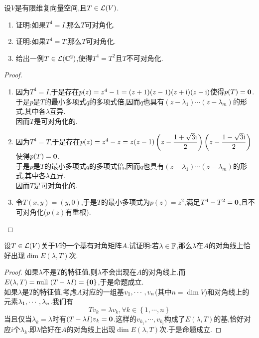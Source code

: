 \documentclass{ctexart}
\begin{document}
\pagestyle{empty}
\begin{center}
    \large{}
\end{center}
\begin{problem}[1.]
    设$V$是有限维复向量空间,且$T\in\mathcal{L}(V)$.
    \begin{enumerate}[label=\tbf{(\arabic*)}]
        \item 证明:如果$T^4=I$,那么$T$可对角化.
        \item 证明:如果$T^4=T$,那么$T$可对角化.
        \item 给出一例$T\in\mathcal{L}(\mathbb{C}^2)$,使得$T^4=T^2$且$T$不可对角化.
    \end{enumerate}
\end{problem}
\begin{proof}
    \begin{enumerate}[label=\tbf{(\arabic*)}]
        \item 因为$T^4=I$,于是存在$p(z)=z^4-1=(z+1)(z-1)(z+\text{i})(z-\text{i})$使得$p(T)=\mathbf0$.\\
            于是$p$是$T$的最小多项式$q$的多项式倍,因而$q$也具有$(z-\lambda_1)\cdots(z-\lambda_m)$的形式,其中各$\lambda$互异.\\
            因而$T$是可对角化的.
        \item 因为$T^4=T$,于是存在$p(z)=z^4-z=z(z-1)\left(z-\dfrac{1+\sqrt{3}\text{i}}{2}\right)\left(z-\dfrac{1-\sqrt3\text{i}}{2}\right)$使得$p(T)=\mathbf0$.\\
            于是$p$是$T$的最小多项式$q$的多项式倍,因而$q$也具有$(z-\lambda_1)\cdots(z-\lambda_m)$的形式,其中各$\lambda$互异.\\
            因而$T$是可对角化的.
        \item 令$T(x,y)=(y,0)$,于是$T$的最小多项式为$p(z)=z^2$,满足$T^4-T^2=\mathbf0$,且不可对角化($p(z)$有重根).
    \end{enumerate}
\end{proof}
\begin{problem}[2.]
    设$T\in\mathcal{L}(V)$关于$V$的一个基有对角矩阵$A$.试证明:若$\lambda\in\mathbb{F}$,那么$\lambda$在$A$的对角线上恰好出现$\dim E(\lambda,T)$次.
\end{problem}
\begin{proof}
    如果$\lambda$不是$T$的特征值,则$\lambda$不会出现在$A$的对角线上.而$E(\lambda,T)=\text{null }(T-\lambda I)=\left\{\mathbf0\right\}$,于是命题成立.\\
    如果$\lambda$是$T$的特征值,考虑$A$对应的一组基${v}_1,\cdots,{v}_{n}$(其中$n=\dim V$)和对角线上的元素${\lambda}_1,\cdots,{\lambda}_{n}$.我们有
    \[Tv_k=\lambda v_k,\forall k\in\left\{1,\cdots,n\right\}\]
    当且仅当$\lambda_k=\lambda$时有$(T-\lambda I)v_k=\mathbf0$.这样的$v_{k_1},\cdots,v_{k_i}$构成了$E(\lambda,T)$的基,恰好对应$i$个$\lambda_k$.即$\lambda$恰好在$A$的对角线上出现$\dim E(\lambda,T)$次.于是命题成立.
\end{proof}
\end{document}
